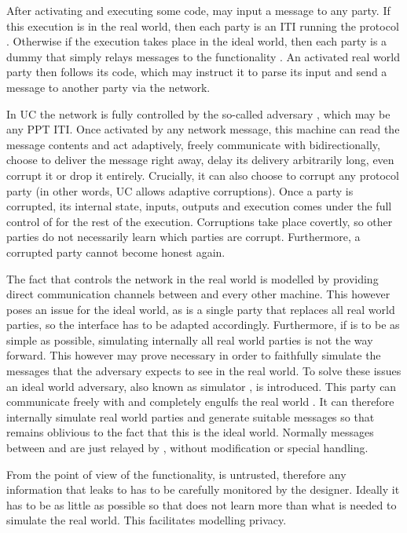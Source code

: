   After activating and executing some code, \environment may input a message to
  any party. If this execution is in the real world, then each party is an ITI
  running the protocol \prot. Otherwise if the execution takes place in the
  ideal world, then each party is a dummy that simply relays messages to the
  functionality \func. An activated real world party then follows its code,
  which may instruct it to parse its input and send a message to another party
  via the network.

  In UC the network is fully controlled by the so-called adversary \adversary,
  which may be any PPT ITI. Once activated by any network message, this machine
  can read the message contents and act adaptively, freely communicate with
  \environment bidirectionally, choose to deliver the message right away, delay
  its delivery arbitrarily long, even corrupt it or drop it entirely. Crucially,
  it can also choose to corrupt any protocol party (in other words, UC allows
  adaptive corruptions). Once a party is corrupted, its internal state, inputs,
  outputs and execution comes under the full control of \adversary for the rest
  of the execution. Corruptions take place covertly, so other parties do not
  necessarily learn which parties are corrupt. Furthermore, a corrupted party
  cannot become honest again.

  The fact that \adversary controls the network in the real world is modelled by
  providing direct communication channels between \adversary and every other
  machine. This however poses an issue for the ideal world, as \func is a single
  party that replaces all real world parties, so the interface has to be adapted
  accordingly. Furthermore, if \func is to be as simple as possible, simulating
  internally all real world parties is not the way forward. This however may
  prove necessary in order to faithfully simulate the messages that the
  adversary expects to see in the real world. To solve these issues an ideal
  world adversary, also known as simulator \simulator, is introduced. This party
  can communicate freely with \func and completely engulfs the real world
  \adversary. It can therefore internally simulate real world parties and
  generate suitable messages so that \adversary remains oblivious to the fact
  that this is the ideal world. Normally messages between \adversary and
  \environment are just relayed by \simulator, without modification or special
  handling.

  From the point of view of the functionality, \simulator is untrusted,
  therefore any information that \func leaks to \simulator has to be carefully
  monitored by the designer. Ideally it has to be as little as possible so that
  \simulator does not learn more than what is needed to simulate the real world.
  This facilitates modelling privacy.

